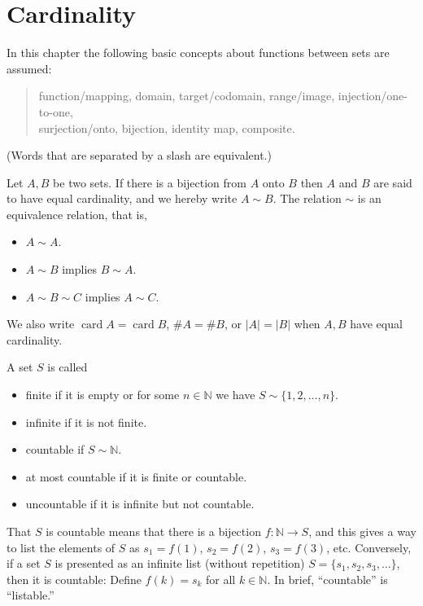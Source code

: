 \section{Cardinality}
\label{sec:cardinality}

In this chapter the following basic concepts about functions between sets are assumed:

\begin{quote}
  \textsf{function/mapping, domain, target/codomain, range/image, injection/one-to-one, \\ surjection/onto, bijection, identity map, composite.}
\end{quote}
(Words that are separated by a slash are equivalent.)

Let $A, B$ be two sets.
If there is a bijection from $A$ onto $B$ then $A$ and $B$ are said to have \textsf{equal cardinality}, and we hereby write $A \sim B$.
The relation $\sim$ is an equivalence relation, that is,
\begin{itemize}
  \item $A \sim A$.
  \item $A \sim B$ implies $B \sim A$.
  \item $A \sim B \sim C$ implies $A \sim C$.
\end{itemize}
We also write $\operatorname{card} A = \operatorname{card} B$, $\# A = \# B$, or $|A| = |B|$ when $A, B$ have equal cardinality.

\begin{defn}
  A set $S$ is called
  \begin{itemize}
    \item \textsf{finite} if it is empty or for some $n \in \mathbb{N}$ we have $S \sim \{1, 2, \dots, n \}$.
    \item \textsf{infinite} if it is not finite.
    \item \textsf{countable} if $S \sim \mathbb{N}$.
    \item \textsf{at most countable} if it is finite or countable.
    \item \textsf{uncountable} if it is infinite but not countable.
  \end{itemize}
\end{defn}

That $S$ is countable means that there is a bijection $f: \mathbb{N} \to S$, and this gives a way to list the elements of $S$ as $s_1 = f(1)$, $s_2 = f(2)$, $s_3 = f(3)$, etc.
Conversely, if a set $S$ is presented as an infinite list (without repetition) $S = \{ s_1, s_2, s_3, \dots \}$, then it is countable:  Define $f(k) = s_k$ for all $k \in \mathbb{N}$.
In brief, ``countable'' is ``listable.''

